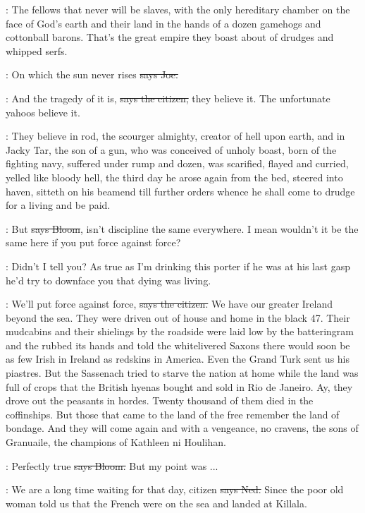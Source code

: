 \citizen:
The fellows that never will be slaves,
with the only hereditary chamber on the face of God's earth
and their land
in the hands of a dozen gamehogs
and cottonball barons.
That's the great empire they boast about
of drudges
and whipped serfs.%

\joe:
On which the sun never rises
\sout{says Joe.}

\citizen:
And the tragedy of it is,
\sout{says the citizen,}
they believe it.
The unfortunate yahoos believe it.

:
They believe in rod,
the scourger almighty,
creator of hell upon earth,
and in Jacky Tar,
the son of a gun,
who was conceived of unholy boast,
born of the fighting navy,
suffered under rump and dozen,
was scarified,
flayed and curried,
yelled like bloody hell,
the third day he arose again
from the bed,
steered into haven,
sitteth on his beamend
till further orders
whence he shall come to drudge
for a living
and be paid.

\Bloom:
But
\sout{says Bloom},
isn't discipline the same everywhere.
I mean
wouldn't it be the same here
if you put force against force?

\Nq:
Didn't I tell you?
As true as I'm drinking this porter
if he was at his last gasp
he'd try to downface you
that dying was living.

\citizen:
We'll put force against force,
\sout{says the citizen.}
We have our greater Ireland beyond the sea.
They were driven out of house and home in the black 47.
Their mudcabins and their shielings by the roadside were laid
low by the batteringram and the  rubbed its hands and told the
whitelivered Saxons there would soon be as few Irish in Ireland as redskins in America.
Even the Grand Turk sent us his piastres.
But the Sassenach tried to starve the nation at home
while the land was full of crops that the British hyenas bought and sold in Rio de Janeiro.
Ay,
they drove out the peasants in hordes.
Twenty thousand of them died in the coffinships.
But those that came to the land of the free remember the land of bondage.
And they will come again and with a vengeance,
no cravens,
the sons of Granuaile,
the champions of Kathleen ni Houlihan.

\Bloom:
Perfectly true
\sout{says Bloom.}
But my point was ...

\lambert:
We are a long time waiting for that day,
citizen
\sout{says Ned.}
Since the poor old woman told us that the French were on the sea and landed at Killala.

